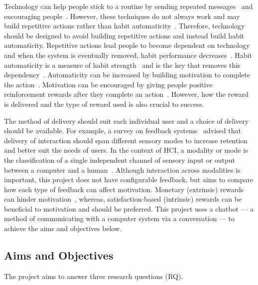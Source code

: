 Technology can help people stick to a routine by sending repeated messages~\cite{chi_crowd_designed_motivation} and encouraging people~\cite{positive_reinforcement_pro}. However, these techniques do not always work and may build repetitive actions rather than habit automaticity~\cite{coaching_not_that_good}. Therefore, technology should be designed to avoid building repetitive actions and instead build habit automaticity. Repetitive actions lead people to become dependent on technology and when the system is eventually removed, habit performance decreases~\cite{article_dont_kick_habit, article_realtime_feedback_improving_medication_taking}. Habit automaticity is a measure of habit strength~\cite{article_4q_SRBAI} and is the key that removes this dependency~\cite{article_beyond_self_tracking_designing_apps}. Automaticity can be increased by building motivation to complete the action~\cite{article_a_self_efficacy, article_meta_analytic_review_intrinsic_motivation}.
Motivation can be encouraged by giving people positive reinforcement rewards after they complete an action~\cite{positive_reinforcement_pro}. However, how the reward is delivered and the type of reward used is also crucial to success.

The method of delivery should suit each individual user and a choice of delivery should be available. For example, a survey on feedback systems~\cite{article_user_centred_multimodal_reminders} advised that delivery of interaction should span different sensory modes to increase retention and better suit the needs of users. In the context of HCI, a modality or mode is the classification of a single independent channel of sensory input or output between a computer and a human~\cite{hci_modality_definition}. Although interaction across modalities is important, this project does not have configurable feedback, but aims to compare how each type of feedback can affect motivation. Monetary (extrinsic) rewards can hinder motivation~\cite{article_meta_analytic_review_intrinsic_motivation}, whereas, satisfaction-based (intrinsic) rewards can be beneficial to motivation and should be preferred.
This project uses a chatbot --- a method of communicating with a computer system via a conversation --- to achieve the aims and objectives below.


\subsection{Aims and Objectives}
The project aims to answer three research questions (RQ).

